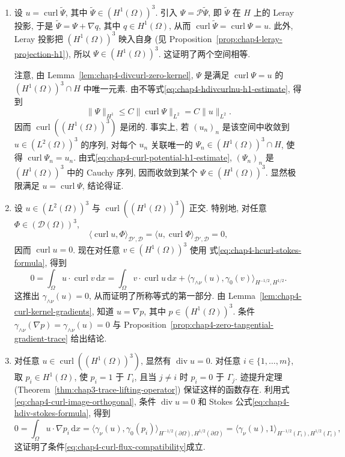 \begin{Proof}
\begin{enumerate}
 \item 设 $u=\operatorname{curl}\widetilde\Psi$, 其中
 $\widetilde\Psi\in(H^1(\Omega))^3$. 引入 $\Psi=\mathcal P\widetilde\Psi$,
 即 $\widetilde\Psi$ 在 $H$ 上的 Leray 投影, 于是
 $\widetilde\Psi=\Psi+\nabla q$, 其中 $q\in H^1(\Omega)$, 从而
 $\operatorname{curl}\widetilde\Psi=\operatorname{curl}\Psi=u$.
 此外, Leray 投影把 $(H^1(\Omega))^3$ 映入自身
 (见 Proposition~\ref{prop:chap4-leray-projection-h1}), 所以
 $\Psi\in(H^1(\Omega))^3$. 这证明了两个空间相等.

 注意, 由 Lemma~\ref{lem:chap4-divcurl-zero-kernel}, $\Psi$ 是满足
 $\operatorname{curl}\Psi=u$ 的 $(H^1(\Omega))^3\cap H$ 中唯一元素.
 由不等式\eqref{eq:chap4-hdivcurlnu-h1-estimate}, 得到
 \begin{equation}
  \|\Psi\|_{H^1}\leq C\|\operatorname{curl}\Psi\|_{L^2}=C\|u\|_{L^2}.
  \label{eq:chap4-curl-potential-h1-estimate}
 \end{equation}
 因而 $\operatorname{curl}((H^1(\Omega))^3)$ 是闭的. 事实上, 若
 $(u_n)_n$ 是该空间中收敛到 $u\in(L^2(\Omega))^3$ 的序列, 对每个 $u_n$ 关联唯一的
 $\Psi_n\in(H^1(\Omega))^3\cap H$, 使得 $\operatorname{curl}\Psi_n=u_n$.
 由式\eqref{eq:chap4-curl-potential-h1-estimate}, $(\Psi_n)_n$ 是
 $(H^1(\Omega))^3$ 中的 Cauchy 序列, 因而收敛到某个
 $\Psi\in(H^1(\Omega))^3$. 显然极限满足 $u=\operatorname{curl}\Psi$, 结论得证.

 \item 设 $u\in(L^2(\Omega))^3$ 与
 $\operatorname{curl}((H^1(\Omega))^3)$ 正交. 特别地, 对任意
 $\Phi\in(\mathcal D(\Omega))^3$,
 \[
  \langle\operatorname{curl}u,\Phi\rangle_{\mathcal D',\mathcal D}
  =\langle u,\operatorname{curl}\Phi\rangle_{\mathcal D',\mathcal D}=0,
 \]
 因而 $\operatorname{curl}u=0$. 现在对任意 $v\in(H^1(\Omega))^3$ 使用
 式\eqref{eq:chap4-hcurl-stokes-formula}, 得到
 \[
  0=\int_\Omega u\cdot\operatorname{curl}v\,\mathrm dx
  =\int_\Omega v\cdot\operatorname{curl}u\,\mathrm dx
  +\langle\gamma_{\wedge\nu}(u),\gamma_0(v)\rangle_{H^{-1/2},H^{1/2}}.
 \]
 这推出 $\gamma_{\wedge\nu}(u)=0$, 从而证明了所称等式的第一部分.
 由 Lemma~\ref{lem:chap4-curl-kernel-gradients}, 知道 $u=\nabla p$, 其中
 $p\in(H^1(\Omega))^3$. 条件
 $\gamma_{\wedge\nu}(\nabla p)=\gamma_{\wedge\nu}(u)=0$ 与
 Proposition~\ref{prop:chap4-zero-tangential-gradient-trace} 给出结论.

 \item 对任意 $u\in\operatorname{curl}((H^1(\Omega))^3)$, 显然有
 $\operatorname{div}u=0$. 对任意 $i\in\{1,\ldots,m\}$, 取
 $p_i\in H^1(\Omega)$, 使 $p_i=1$ 于 $\Gamma_i$, 且当 $j\neq i$ 时
 $p_i=0$ 于 $\Gamma_j$. 迹提升定理
 (Theorem~\ref{thm:chap3-trace-lifting-operator}) 保证这样的函数存在.
 利用式\eqref{eq:chap4-curl-image-orthogonal}, 条件 $\operatorname{div}u=0$ 和
 Stokes 公式\eqref{eq:chap4-hdiv-stokes-formula}, 得到
 \[
  0=\int_\Omega u\cdot\nabla p_i\,\mathrm dx
  =\langle\gamma_\nu(u),\gamma_0(p_i)\rangle_{H^{-1/2}(\partial\Omega),H^{1/2}(\partial\Omega)}
  =\langle\gamma_\nu(u),1\rangle_{H^{-1/2}(\Gamma_i),H^{1/2}(\Gamma_i)},
 \]
 这证明了条件\eqref{eq:chap4-curl-flux-compatibility}成立.


\end{enumerate}
\end{Proof}
